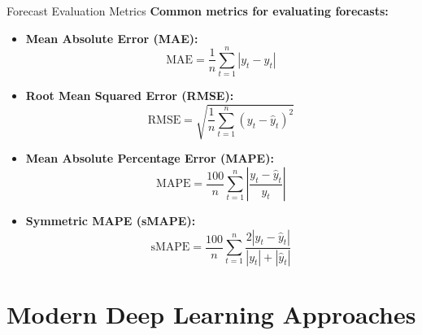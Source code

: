 \documentclass[aspectratio=169]{beamer}
\begin{document}
\begin{frame}{Forecast Evaluation Metrics}
  \textbf{Common metrics for evaluating forecasts:}

  \vspace{0.5em}

  \begin{itemize}
    \item \textbf{Mean Absolute Error (MAE):}
    \begin{equation}
      \text{MAE} = \frac{1}{n} \sum_{t=1}^n |y_t - \hat{y}_t|
    \end{equation}

    \item \textbf{Root Mean Squared Error (RMSE):}
    \begin{equation}
      \text{RMSE} = \sqrt{\frac{1}{n} \sum_{t=1}^n (y_t - \hat{y}_t)^2}
    \end{equation}

    \item \textbf{Mean Absolute Percentage Error (MAPE):}
    \begin{equation}
      \text{MAPE} = \frac{100}{n} \sum_{t=1}^n \left|\frac{y_t - \hat{y}_t}{y_t}\right|
    \end{equation}

    \item \textbf{Symmetric MAPE (sMAPE):}
    \begin{equation}
      \text{sMAPE} = \frac{100}{n} \sum_{t=1}^n \frac{2|y_t - \hat{y}_t|}{|y_t| + |\hat{y}_t|}
    \end{equation}
  \end{itemize}
\end{frame}

\section{Modern Deep Learning Approaches}
\end{document}

